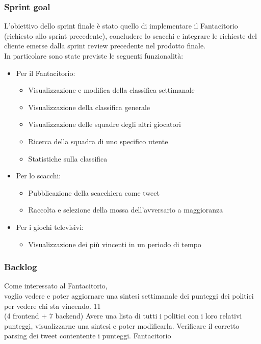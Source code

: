 \subsubsection{Sprint goal}
L'obiettivo dello sprint finale è stato quello di implementare il Fantacitorio (richiesto allo sprint precedente), concludere lo scacchi e 
integrare le richieste del cliente emerse dalla sprint review precedente nel prodotto finale.\\
In particolare sono state previste le seguenti funzionalità:
\begin{itemize}
    \item Per il Fantacitorio:
    \begin{itemize}
        \item Visualizzazione e modifica della classifica settimanale
        \item Visualizzazione della classifica generale
        \item Visualizzazione delle squadre degli altri giocatori
        \item Ricerca della squadra di uno specifico utente
        \item Statistiche sulla classifica
    \end{itemize}
    \item Per lo scacchi:
    \begin{itemize}
        \item Pubblicazione della scacchiera come tweet
        \item Raccolta e selezione della mossa dell'avversario a maggioranza
    \end{itemize}
    \item Per i giochi televisivi:
    \begin{itemize}
        \item Visualizzazione dei più vincenti in un periodo di tempo
    \end{itemize}
\end{itemize}


\subsubsection{Backlog}
\userstory%
{Come interessato al Fantacitorio,\\voglio vedere e poter aggiornare una sintesi settimanale dei punteggi dei politici\\per vedere chi sta vincendo.}%
{11\\(4 frontend + 7 backend)}%
{Avere una lista di tutti i politici con i loro relativi punteggi, visualizzarne una sintesi e poter modificarla.}%
{Verificare il corretto parsing dei tweet contentente i punteggi.}
{Fantacitorio}

